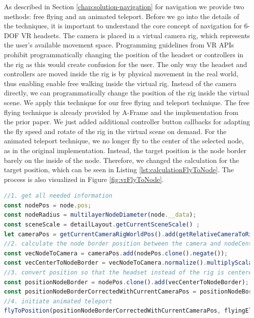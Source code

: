 As described in Section \ref{chap:solution-navigation} for navigation we provide two methods: free flying and an animated teleport.
Before we go into the details of the techniques, it is important to understand the core concept of navigation for 6-DOF VR headsets.
The camera is placed in a virtual camera rig, which represents the user's available movement space.
Programming guidelines from VR APIs prohibit programmatically changing the position of the headset or controllers in the rig as this would create confusion for the user. 
The only way the headset and controllers are moved inside the rig is by physical movement in the real world, thus enabling enable free walking inside the virtual rig.
Instead of the camera directly, we can programmatically change the position of the rig inside the virtual scene. 
We apply this technique for our free flying and teleport technique.
The free flying technique is already provided by A-Frame and the implementation from the prior paper.
We just added additional controller button callbacks for adapting the fly speed and rotate of the rig in the virtual scene on demand.
For the animated teleport technique, we no longer fly to the center of the selected node, as in the original implementation. Instead, the target position is the node border barely on the inside of the node. Therefore, we changed the calculation for the target position, which can be seen in Listing \ref{lst:calculationFlyToNode}. The process is also visualized in Figure \ref{fig:vrFlyToNode}.

\begin{lstlisting}[language=JavaScript,label={lst:calculationFlyToNode},caption=Matrix calculations for determining the target position of the animated teleport.]
//1. get all needed information
const nodePos = node.pos;
const nodeRadius = multilayerNodeDiameter(node.__data);
const sceneScale = detailLayout.getCurrentSceneScale() ;
let cameraPos = getCurrentCameraRigWorldPos().add(getRelativeCameraToRigPos());
//2. calculate the node border position between the camera and nodeCenter
const vecNodeToCamera = cameraPos.add(nodePos.clone().negate());
const vecCenterToNodeBorder = vecNodeToCamera.normalize().multiplyScalar(nodeRadius*0.95*sceneScale);//*0.95 as we want to be slightly inside the selected node
//3. convert position so that the headset instead of the rig is centered
const positionNodeBorder = nodePos.clone().add(vecCenterToNodeBorder);
const positionNodeBorderCorrectedWithCurrentCameraPos = positionNodeBorder.clone().add(getRelativeCameraToRigPos().negate());
//4. initiate animated teleport
flyToPosition(positionNodeBorderCorrectedWithCurrentCameraPos, flyingElement);
\end{lstlisting}
\pagebreak

